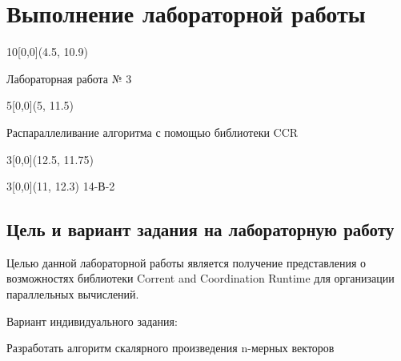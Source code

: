 \newcommand{\placetextbox}[3]{%
	\setbox0=\hbox{#3}%
	\AddToShipoutPictureFG*{%
		\put(\LenToUnit{#1\paperwidth},\LenToUnit{#2\paperheight}){\vtop{{\null}\makebox[0pt][c]{#3}}}%
	}%
}%

\fancyhf{}                          %

\chapter{Выполнение лабораторной работы}						


\begin{textblock}{10}[0,0](4.5, 10.9)
	\begin{center}
		\Large	Лабораторная работа № 3\\
	\end{center}
\end{textblock}

\begin{textblock}{5}[0,0](5, 11.5)
\begin{center}
\large	Распараллеливание алгоритма с помощью библиотеки CCR\\
\end{center}
\end{textblock}

\begin{textblock}{3}[0,0](12.5, 11.75)
	\pageref{LastPage}
\end{textblock}

\begin{textblock}{3}[0,0](11, 12.3)
	14-В-2
\end{textblock}
	
\section{Цель и вариант задания на лабораторную работу}	
	Целью данной лабораторной работы является получение представления о возможностях библиотеки Corrent and Coordination Runtime для организации параллельных вычислений.
	
	Вариант индивидуального задания:
	
	 Разработать алгоритм скалярного произведения n-мерных векторов

